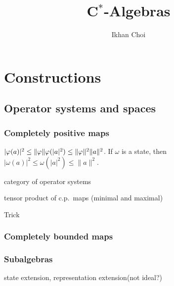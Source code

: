 \documentclass{../../large}
\begin{document}
\title{C$^*$-Algebras}
\author{Ikhan Choi}
\maketitle
\tableofcontents

\part{Constructions}

\chapter{Operator systems and spaces}
\section{Completely positive maps}

$|\varphi(a)|^2\le\|\varphi\|\varphi(|a|^2)\le\|\varphi\|^2\|a\|^2$.
If $\omega$ is a state, then
$|\omega(a)|^2\le\omega(|a|^2)\le\|a\|^2$.

category of operator systems

\begin{prb}
\end{prb}

\begin{prb}
\end{prb}

tensor product of c.p.~maps (minimal and maximal)

\begin{prb}
Trick
\end{prb}

\section{Completely bounded maps}



\section{Subalgebras}


\begin{prb}
state extension, representation extension(not ideal?)
\end{prb}

\begin{prb}
\end{prb}
\end{document}
